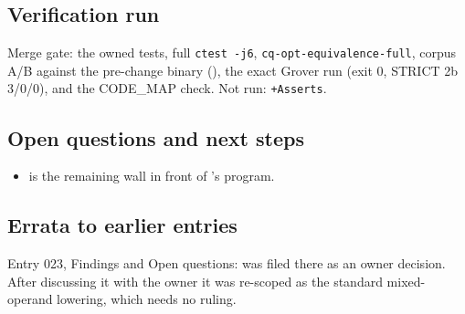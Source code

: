 \subsection*{Verification run}
Merge gate: the owned tests, full \texttt{ctest -j6},
\texttt{cq-opt-equivalence-full}, corpus A/B against the pre-change binary
(), the exact Grover run (exit 0, STRICT 2b 3/0/0), and the
CODE\_MAP check. Not run: \texttt{+Asserts}.

\subsection*{Open questions and next steps}
\begin{itemize}
  \item {} is the remaining wall in front of 's program.
\end{itemize}

\subsection*{Errata to earlier entries}
Entry 023, Findings and Open questions:  was filed there as an
owner decision. After discussing it with the owner it was re-scoped as the
standard mixed-operand lowering, which needs no ruling.
